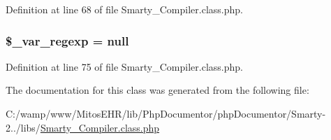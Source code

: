 \-Definition at line 68 of file \-Smarty\-\_\-\-Compiler.\-class.\-php.

\hypertarget{class_smarty___compiler_aeed5604b636f16f909069703b776f817}{
\subsubsection[{\$\-\_\-var\-\_\-regexp}]{\setlength{\rightskip}{0pt plus 5cm}\$\-\_\-var\-\_\-regexp = null}}\label{class_smarty___compiler_aeed5604b636f16f909069703b776f817}


\-Definition at line 75 of file \-Smarty\-\_\-\-Compiler.\-class.\-php.



\-The documentation for this class was generated from the following file\-:\begin{DoxyCompactItemize}
\item 
\-C\-:/wamp/www/\-Mitos\-E\-H\-R/lib/\-Php\-Documentor/php\-Documentor/\-Smarty-\/2../libs/\hyperlink{_smarty___compiler_8class_8php}{\-Smarty\-\_\-\-Compiler.\-class.\-php}\end{DoxyCompactItemize}

